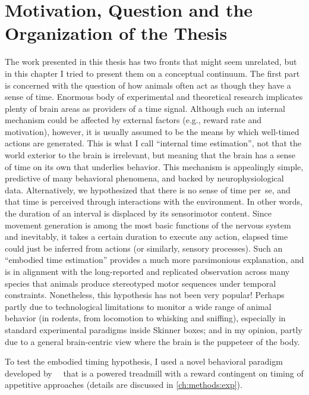 \section[Motivation, Question and More]{Motivation, Question and the Organization of the Thesis}
\label{intro:question}

The work presented in this thesis has two fronts that might seem unrelated, but in this chapter I tried to present them on a conceptual continuum.
The first part is concerned with the question of how animals often act as though they have a sense of time.
Enormous body of experimental and theoretical research implicates plenty of brain areas as providers of a time signal.
Although such an internal mechanism could be affected by external factors (e.g., reward rate and motivation), however, it is usually assumed to be the means by which well-timed actions are generated.
This is what I call ``internal time estimation'', not that the world exterior to the brain is irrelevant, but meaning that the brain has a sense of time on its own that underlies behavior.
This mechanism is appealingly simple, predictive of many behavioral phenomena, and backed by neurophysiological data.
Alternatively, we hypothesized that there is no sense of time per~se, and that time is perceived through interactions with the environment.
In other words, the duration of an interval is displaced by its sensorimotor content.
Since movement generation is among the most basic functions of the nervous system and inevitably, it takes a certain duration to execute any action, elapsed time could just be inferred from actions (or similarly, sensory processes).
Such an ``embodied time estimation'' provides a much more parsimonious explanation, and is in alignment with the long-reported and replicated observation across many species that animals produce stereotyped motor sequences under temporal constraints.
Nonetheless, this hypothesis has not been very popular!
Perhaps partly due to technological limitations to monitor a wide range of animal behavior (in rodents, from locomotion to whisking and sniffing), especially in standard experimental paradigms inside Skinner boxes; and in my opinion, partly due to a general brain-centric view where the brain is the puppeteer of the body.
\par
To test the embodied timing hypothesis, I used a novel behavioral paradigm developed by~\citeauthor{Rueda2015NN}~\cite{Rueda2015NN} that is a powered treadmill with a reward contingent on timing of appetitive approaches (details are discussed in \autoref{ch:methods:exp}).

